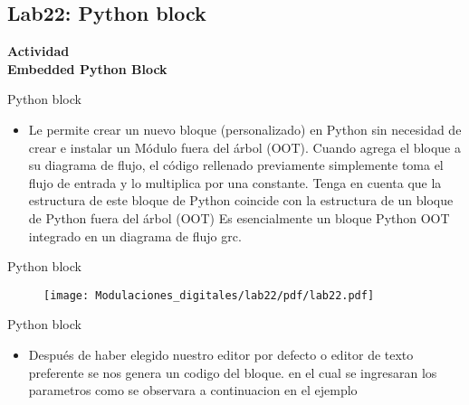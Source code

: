 \subsection{Lab22: Python block}

\begin{frame}{}


\bfseries{\textrm{\LARGE Actividad\\ \Large Embedded Python Block}}
\raggedright
\end{frame}


\begin{frame}{Python block }



  \begin{itemize}
  \item \justifying Le permite crear un nuevo bloque (personalizado) en Python sin necesidad de crear e instalar un Módulo fuera del árbol (OOT). Cuando agrega el bloque a su diagrama de flujo, el código rellenado previamente simplemente toma el flujo de entrada y lo multiplica por una constante. Tenga en cuenta que la estructura de este bloque de Python coincide con la estructura de un bloque de Python fuera del árbol (OOT) Es esencialmente un bloque Python OOT integrado en un diagrama de flujo grc.


 
  \end{itemize}
\end{frame}

\begin{frame}{Python block}

\begin{figure}[H]
\centering
\texttt{[image: Modulaciones\_digitales/lab22/pdf/lab22.pdf]}
\end{figure}
\end{frame}


\begin{frame}{Python block }



  \begin{itemize}
  \item \justifying Después de haber elegido nuestro editor por defecto o editor de texto preferente se nos genera un codigo del bloque. en el cual se ingresaran los parametros como se observara a continuacion en el ejemplo


 
  \end{itemize}
\end{frame}

